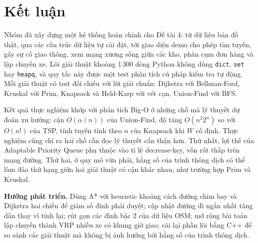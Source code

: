 \section{Kết luận}

Nhóm đã xây dựng một hệ thống hoàn chỉnh cho Đề tài 4: từ dữ liệu bản đồ thật, qua các cấu trúc dữ liệu tự cài đặt, tới giao
diện demo cho phép tìm tuyến, gây sự cố giao thông, xem mạng xương sống giữa các kho, phân cụm đơn hàng và lập chuyến xe.
Lõi giải thuật khoảng 1\,300 dòng Python không dùng \texttt{dict}, \texttt{set} hay \texttt{heapq}, và quy tắc này được một
test phân tích cú pháp kiểm tra tự động. Mỗi giải thuật có test đối chiếu với lời giải chuẩn: Dijkstra với Bellman-Ford,
Kruskal với Prim, Knapsack và Held-Karp với vét cạn, Union-Find với BFS.

Kết quả thực nghiệm khớp với phân tích Big-O ở những chỗ mà lý thuyết dự đoán xu hướng: cận $O(\alpha(n))$ của Union-Find,
độ tăng $O(n^2 2^n)$ so với $O(n!)$ của TSP, tính tuyến tính theo $n$ của Knapsack khi $W$ cố định. Thực nghiệm cũng chỉ ra hai
chỗ cần đọc lý thuyết cẩn thận hơn. Thứ nhất, lợi thế của Adaptable Priority Queue phụ thuộc vào tỉ lệ decrease-key, vốn rất
thấp trên mạng đường. Thứ hai, ở quy mô vừa phải, hằng số của trình thông dịch có thể làm đảo thứ hạng giữa hai giải thuật có
cận khác nhau, như trường hợp Prim và Kruskal.

\textbf{Hướng phát triển.} Dùng A* với heuristic khoảng cách đường chim bay và Dijkstra hai chiều để giảm số đỉnh phải duyệt;
cập nhật đường đi ngắn nhất tăng dần thay vì tính lại; rút gọn các đỉnh bậc 2 của dữ liệu OSM; mở rộng bài toán lập chuyến
thành VRP nhiều xe có khung giờ giao; cài lại phần lõi bằng C++ để so sánh các giải thuật mà không bị ảnh hưởng bởi hằng số
của trình thông dịch.
